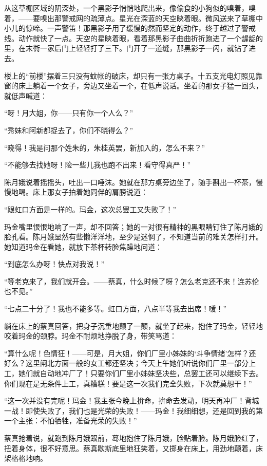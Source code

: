 \par 从这草棚区域的阴深处，一个黑影子悄悄地爬出来，像偷食的小狗似的嗅着，嗅着，——要嗅出那警戒网的疏薄点。星光在深蓝的天空鿃着眼。微风送来了草棚中小儿的惊啼。一声警笛！那黑影子用了缓慢的然而坚定的动作，终于越过了警戒线。动作就快了一点。天空的星鿃着眼，看着那黑影子曲曲折折跑进了一个龌龊的里，在末衖一家后门上轻轻打了三下。门开了一道缝，那黑影子一闪，就钻了进去。
\par 楼上的“前楼”摆着三只没有蚊帐的破床，却只有一张方桌子。十五支光电灯照见靠窗的床上躺着一个女子，旁边又坐着一个，在低声说话。坐着的那女子猛一回头，就低声喊道：
\par “呀！月大姐，你——只有你一个人么？”
\par “秀妹和阿新都捉去了，你们不晓得么？”
\par “晓得！我是问那个姓朱的，朱桂英罢，新加入的，怎么不来？”
\par “不能够去找她呀！险一些儿我也跑不出来！看守得真严！”
\par 陈月娥说着摇摇头，吐出一口唾沫。她就在那方桌旁边坐了，随手斟出一杯茶，慢慢地喝。床上那女子拍着她同伴的肩膀说道：
\par “跟虹口方面是一样的。玛金，这次总罢工又失败了！”
\par 玛金嘴里恨恨地响了一声，却不回答；她的一对很有精神的黑眼睛钉住了陈月娥的脸孔看。陈月娥显然有些懒洋洋地，至少是迷惘了，不知道当前的难关怎样打开。她知道玛金在看她，就放下茶杯转脸焦躁地问道：
\par “到底怎么办呀！快点对我说！”
\par “等老克来了，我们就开会。——蔡真，什么时候了呀？怎么老克还不来！连苏伦也不见。”
\par “七点二十分了！我也不能多等。虹口方面，八点半等我去出席！嗳！”
\par 躺在床上的蔡真回答，把身子沉重地颠了一颠，就坐了起来，抱住了玛金，轻轻地咬着玛金的颈脖。玛金不耐烦地挣脱了身，带笑骂道：
\par “算什么呢！色情狂！——可是，月大姐，你们厂里小姊妹的‘斗争情绪’怎样？还好么？这里闸北方面一般的女工都还坚决；今天上午她们听说你们厂里一部分上工，她们就自动地冲厂了！只要你们厂里小姊妹坚决些，总罢工还可以继续下去。你们现在是无条件上工，真糟糕！要是这一次我们完全失败，下次就莫想干！”
\par “这一次并没有完呢！玛金！我主张今晚上拚命，拚命去发动，明天再冲厂！背城一战！即使失败了，我们也是光荣的失败！——玛金！我细细想，还是回到我的第一个主张：不怕牺牲，准备光荣的失败！”
\par 蔡真抢着说，就跑到陈月娥跟前，蓦地抱住了陈月娥，脸贴着脸。陈月娥脸红了，扭着身体，很不好意思。蔡真歇斯底里地狂笑着，又掷身在床上，用劲地颠着，床架格格地响。
